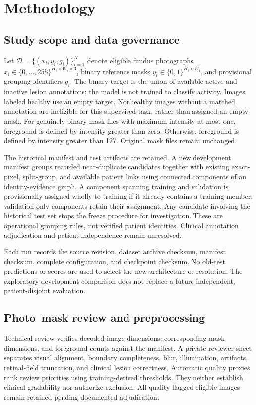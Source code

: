 \section{Methodology}
\subsection{Study scope and data governance}
Let $\mathcal D=\{(x_i,y_i,g_i)\}_{i=1}^{N}$ denote eligible fundus photographs $x_i\in\{0,\ldots,255\}^{H_i\times W_i\times3}$, binary reference masks $y_i\in\{0,1\}^{H_i\times W_i}$, and provisional grouping identifiers $g_i$. The binary target is the union of available active and inactive lesion annotations; the model is not trained to classify activity. Images labeled healthy use an empty target. Nonhealthy images without a matched annotation are ineligible for this supervised task, rather than assigned an empty mask. For genuinely binary mask files with maximum intensity at most one, foreground is defined by intensity greater than zero. Otherwise, foreground is defined by intensity greater than 127. Original mask files remain unchanged.

The historical manifest and test artifacts are retained. A new development manifest groups recorded near-duplicate candidates together with existing exact-pixel, split-group, and available patient links using connected components of an identity-evidence graph. A component spanning training and validation is provisionally assigned wholly to training if it already contains a training member; validation-only components retain their assignment. Any candidate involving the historical test set stops the freeze procedure for investigation. These are operational grouping rules, not verified patient identities. Clinical annotation adjudication and patient independence remain unresolved.

Each run records the source revision, dataset archive checksum, manifest checksum, complete configuration, and checkpoint checksum. No old-test predictions or scores are used to select the new architecture or resolution. The exploratory development comparison does not replace a future independent, patient-disjoint evaluation.

\subsection{Photo--mask review and preprocessing}
Technical review verifies decoded image dimensions, corresponding mask dimensions, and foreground counts against the manifest. A private reviewer sheet separates visual alignment, boundary completeness, blur, illumination, artifacts, retinal-field truncation, and clinical lesion correctness. Automatic quality proxies rank review priorities using training-derived thresholds. They neither establish clinical gradability nor authorize exclusion. All quality-flagged eligible images remain retained pending documented adjudication.

